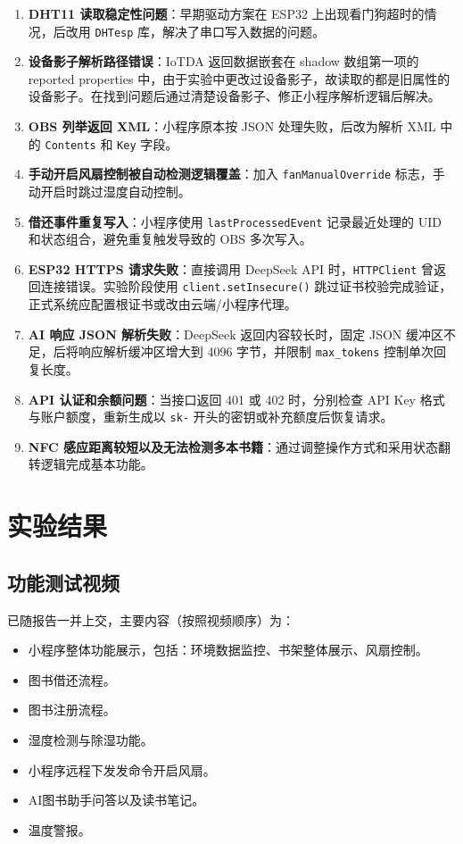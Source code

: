 \documentclass[12pt,hyperref,a4paper,UTF8]{ctexart}
\begin{document}
\begin{enumerate}
    \item \textbf{DHT11 读取稳定性问题}：早期驱动方案在 ESP32 上出现看门狗超时的情况，后改用 \texttt{DHTesp} 库，解决了串口写入数据的问题。
    \item \textbf{设备影子解析路径错误}：IoTDA 返回数据嵌套在 shadow 数组第一项的 reported properties 中，由于实验中更改过设备影子，故读取的都是旧属性的设备影子。在找到问题后通过清楚设备影子、修正小程序解析逻辑后解决。
    \item \textbf{OBS 列举返回 XML}：小程序原本按 JSON 处理失败，后改为解析 XML 中的 \texttt{Contents} 和 \texttt{Key} 字段。
    \item \textbf{手动开启风扇控制被自动检测逻辑覆盖}：加入 \texttt{fanManualOverride} 标志，手动开启时跳过湿度自动控制。
    \item \textbf{借还事件重复写入}：小程序使用 \texttt{lastProcessedEvent} 记录最近处理的 UID 和状态组合，避免重复触发导致的 OBS 多次写入。
    \item \textbf{ESP32 HTTPS 请求失败}：直接调用 DeepSeek API 时，\texttt{HTTPClient} 曾返回连接错误。实验阶段使用 \texttt{client.setInsecure()} 跳过证书校验完成验证，正式系统应配置根证书或改由云端/小程序代理。
    \item \textbf{AI 响应 JSON 解析失败}：DeepSeek 返回内容较长时，固定 JSON 缓冲区不足，后将响应解析缓冲区增大到 4096 字节，并限制 \texttt{max\_tokens} 控制单次回复长度。
    \item \textbf{API 认证和余额问题}：当接口返回 401 或 402 时，分别检查 API Key 格式与账户额度，重新生成以 \texttt{sk-} 开头的密钥或补充额度后恢复请求。
    \item \textbf{NFC 感应距离较短以及无法检测多本书籍}：通过调整操作方式和采用状态翻转逻辑完成基本功能。
\end{enumerate}

\section{实验结果}

\subsection{功能测试视频}

已随报告一并上交，主要内容（按照视频顺序）为：

\begin{itemize}
    \item 小程序整体功能展示，包括：环境数据监控、书架整体展示、风扇控制。
    \item 图书借还流程。
    \item 图书注册流程。
    \item 湿度检测与除湿功能。
    \item 小程序远程下发发命令开启风扇。
    \item AI图书助手问答以及读书笔记。
    \item 温度警报。
\end{itemize}
\end{document}
